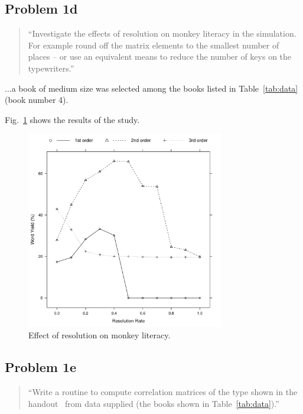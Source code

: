 \documentclass[conference]{IEEEtran}
\newcommand{\codefile}[1]{
  \begin{framed}
  \fontsize{5.65}{6.78}\selectfont
  
  \end{framed}
}
\begin{document}
\subsection{Problem 1d}
\label{sec:problem1d}

\begin{quote}
``Investigate the effects of resolution on monkey literacy in the simulation. 
For example round off the matrix elements to the smallest number of places --
or use an equivalent means to reduce the number of keys on the typewriters.''
\end{quote}

...a book of medium size was selected among the books listed in Table~\ref{tab:data} 
(book number 4).

\codefile{problem1d.py}

Fig.~\ref{fig:problem1d} shows the results of the study.

\begin{figure}[!t]
\centering
\includegraphics[width=3.4in]{problem1d}
\caption{Effect of resolution on monkey literacy.}
\label{fig:problem1d}
\end{figure}


\subsection{Problem 1e}
\label{sec:problem1e}

\begin{quote}
``Write a routine to compute correlation matrices of the type shown in the 
handout~\cite{Bennett1976} from data supplied (the books shown in Table~\ref{tab:data}).''
\end{quote}

\codefile{problem1e.py}
\end{document}
